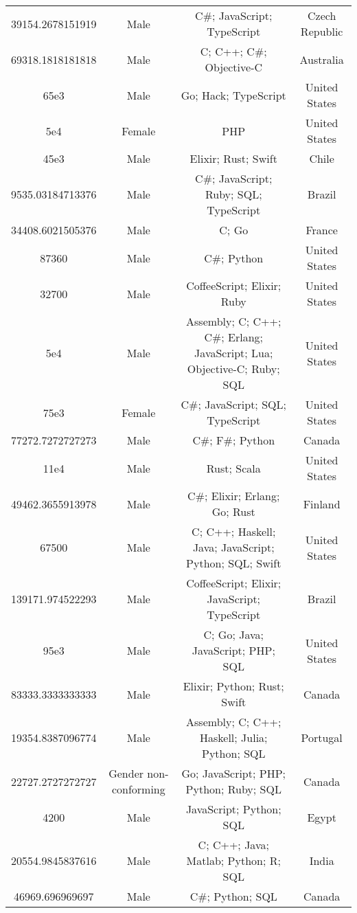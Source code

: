 \begin{center}
\begin{tabular}{ |c|c|c|c| }
39154.2678151919  &  Male  &  C\#; JavaScript; TypeScript  &  Czech Republic  \\ 
69318.1818181818  &  Male  &  C; C++; C\#; Objective-C  &  Australia  \\ 
65e3  &  Male  &  Go; Hack; TypeScript  &  United States  \\ 
5e4  &  Female  &  PHP  &  United States  \\ 
45e3  &  Male  &  Elixir; Rust; Swift  &  Chile  \\ 
9535.03184713376  &  Male  &  C\#; JavaScript; Ruby; SQL; TypeScript  &  Brazil  \\ 
34408.6021505376  &  Male  &  C; Go  &  France  \\ 
87360  &  Male  &  C\#; Python  &  United States  \\ 
32700  &  Male  &  CoffeeScript; Elixir; Ruby  &  United States  \\ 
5e4  &  Male  &  Assembly; C; C++; C\#; Erlang; JavaScript; Lua; Objective-C; Ruby; SQL  &  United States  \\ 
75e3  &  Female  &  C\#; JavaScript; SQL; TypeScript  &  United States  \\ 
77272.7272727273  &  Male  &  C\#; F\#; Python  &  Canada  \\ 
11e4  &  Male  &  Rust; Scala  &  United States  \\ 
49462.3655913978  &  Male  &  C\#; Elixir; Erlang; Go; Rust  &  Finland  \\ 
67500  &  Male  &  C; C++; Haskell; Java; JavaScript; Python; SQL; Swift  &  United States  \\ 
139171.974522293  &  Male  &  CoffeeScript; Elixir; JavaScript; TypeScript  &  Brazil  \\ 
95e3  &  Male  &  C; Go; Java; JavaScript; PHP; SQL  &  United States  \\ 
83333.3333333333  &  Male  &  Elixir; Python; Rust; Swift  &  Canada  \\ 
19354.8387096774  &  Male  &  Assembly; C; C++; Haskell; Julia; Python; SQL  &  Portugal  \\ 
22727.2727272727  &  Gender non-conforming  &  Go; JavaScript; PHP; Python; Ruby; SQL  &  Canada  \\ 
4200  &  Male  &  JavaScript; Python; SQL  &  Egypt  \\ 
20554.9845837616  &  Male  &  C; C++; Java; Matlab; Python; R; SQL  &  India  \\ 
46969.696969697  &  Male  &  C\#; Python; SQL  &  Canada  \\ 

\end{tabular}
\end{center}
